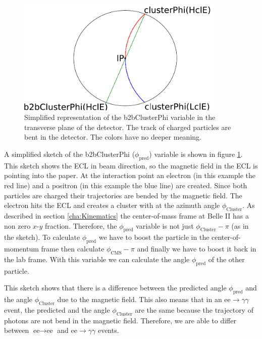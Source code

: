\documentclass[a4paper,11pt,twosided,final,german,openbib,pdftex,listof=totoc,bibliography=totoc]{scrbook}
\begin{document}
\begin{figure}[h!]
	\centering
	\includegraphics[width=10cm]{Bilder/b2b_2}
	\caption[Sketch Of The b2bClusterPhi Variable]{Simplified representation of the b2bClusterPhi variable in the transverse plane of the detector. The track of charged particles are bent in the detector. The colors have no deeper meaning.}
	\label{fig:Sketchb2b}
\end{figure}

A simplified sketch of the b2bClusterPhi ($\phi_{\textrm{pred}}$) variable is shown in figure \ref{fig:Sketchb2b}. This sketch shows the ECL in beam direction, so the magnetic field in the ECL is pointing into the paper. At the interaction point an electron (in this example the red line) and a positron (in this example the blue line) are created. Since both particles are charged their trajectories are bended by the magnetic field. The electron hits the ECL and creates a cluster with at the azimuth angle $\phi_{\textrm{Cluster}}$. As described in section \ref{cha:Kinematics} the center-of-mass frame at Belle II has a non zero $x$-$y$ fraction. Therefore, the  $\phi_{\textrm{pred}}$ variable is not just $ \phi_{\textrm{Cluster}} - \pi$ (as in the sketch). To calculate $\phi_{\textrm{pred}}$ we have to boost the particle in the center-of-momentum frame then calculate $ \phi_{\textrm{CMS}}- \pi$ and finally we have to boost it back in the lab frame. With this variable we can calculate the angle $\phi_{\textrm{pred}}$ of the other particle. 

This sketch shows that there is a difference between the predicted angle $\phi_{\textrm{pred}}$ and the angle $ \phi_{\textrm{Cluster}}$ due to the magnetic field. This also means that in an $\textrm{ee} \rightarrow \gamma \gamma$ event, the predicted and the angle $ \phi_{\textrm{Cluster}}$ are the same because the trajectory of photons are not bend in the magnetic field. Therefore, we are able to differ between $\textrm{ee} \rightarrow \textrm{ee}$ and $\textrm{ee} \rightarrow \gamma \gamma$ events.
\end{document}

